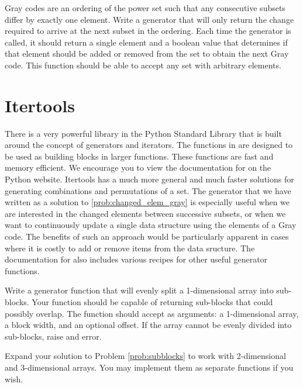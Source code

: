 \begin{problem}
\label{prob:changed_elem_gray}
Gray codes are an ordering of the power set such that any consecutive subsets differ by exactly one element.  Write a generator that will only return the change required to arrive at the next subset in the ordering.  Each time the generator is called, 
it should return a single element and a boolean value that determines if that element should be
added or removed from the set to obtain the next Gray code.  This function should be able to accept any set with arbitrary elements.
\end{problem}

\section*{Itertools}
There is a very powerful library in the Python Standard Library that is built around the concept
of generators and iterators.  The functions in  are designed to be used as
building blocks in larger functions.  These functions are fast and memory efficient.
We encourage you to view the documentation for  on the Python website.  Itertools has a much more general and much faster solutions for generating combinations and permutations of a set.
The generator that we have written as a solution to \ref{prob:changed_elem_gray} is especially useful when we are interested in the changed elements between successive subsets, or when we want to continuously update a single data structure using the elements of a Gray code.
The benefits of such an approach would be particularly apparent in cases where it is costly to add or remove items from the data sructure.
The documentation for  also includes various recipes for other useful generator functions.

\begin{problem}
\label{prob:subblocks}
Write a generator function that will evenly split a 1-dimensional array into sub-blocks.
Your function should be capable of returning sub-blocks that could possibly overlap.
The function should accept as arguments: a 1-dimensional array,
a block width, and an optional offset.  If the array cannot be evenly divided into
sub-blocks, raise and error.
\end{problem}

\begin{problem}
Expand your solution to Problem \ref{prob:subblocks} to work with 2-dimensional and 3-dimensional
arrays.  You may implement them as separate functions if you wish.
\end{problem}

\printbibliography

% 
